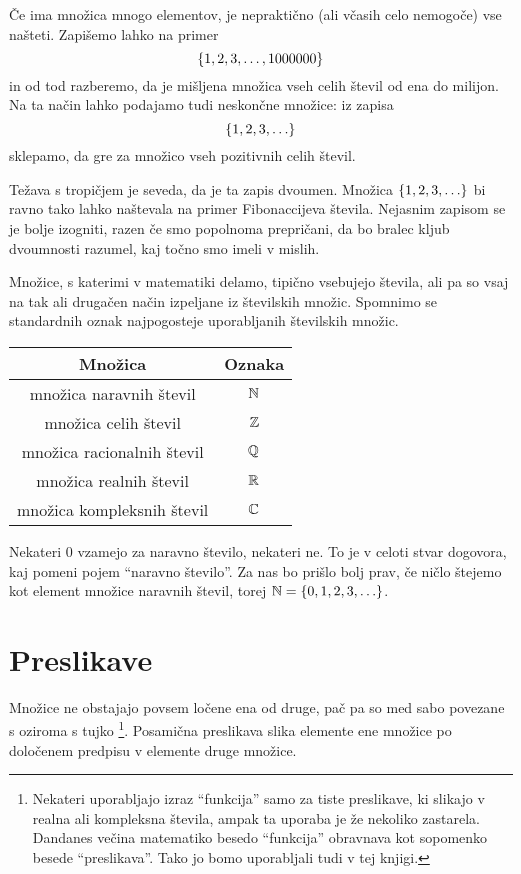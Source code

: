 Če ima množica mnogo elementov, je nepraktično (ali včasih celo nemogoče) vse našteti. Zapišemo lahko na primer
\[\set{1, 2, 3, \ldots, 1000000}\]
in od tod razberemo, da je mišljena množica vseh celih števil od ena do milijon. Na ta način lahko podajamo tudi neskončne množice: iz zapisa
\[\set{1, 2, 3, \ldots}\]
sklepamo, da gre za množico vseh pozitivnih celih števil.

Težava s tropičjem je seveda, da je ta zapis dvoumen. Množica $\set{1, 2, 3, \ldots}$ bi ravno tako lahko naštevala na primer Fibonaccijeva števila. Nejasnim zapisom se je bolje izogniti, razen če smo popolnoma prepričani, da bo bralec kljub dvoumnosti razumel, kaj točno smo imeli v mislih.

Množice, s katerimi v matematiki delamo, tipično vsebujejo števila, ali pa so vsaj na tak ali drugačen način izpeljane iz številskih množic. Spomnimo se standardnih oznak najpogosteje uporabljanih številskih množic.
\begin{center}
\begin{tabular}{|cc|}
\hline
\textbf{Množica} & \textbf{Oznaka} \\
\hline
množica naravnih števil & $\mathbb{N}$ \\
množica celih števil & $\mathbb{Z}$ \\
množica racionalnih števil & $\mathbb{Q}$ \\
množica realnih števil & $\mathbb{R}$ \\
množica kompleksnih števil & $\mathbb{C}$ \\
\hline
\end{tabular}
\end{center}

Nekateri $0$ vzamejo za naravno število, nekateri ne. To je v celoti stvar dogovora, kaj pomeni pojem ``naravno število''. Za nas bo prišlo bolj prav, če ničlo štejemo kot element množice naravnih števil, torej $\NN = \set{0, 1, 2, 3, \ldots}$.



\section{Preslikave}


Množice ne obstajajo povsem ločene ena od druge, pač pa so med sabo povezane s  oziroma s tujko \footnote{Nekateri uporabljajo izraz ``funkcija'' samo za tiste preslikave, ki slikajo v realna ali kompleksna števila, ampak ta uporaba je že nekoliko zastarela. Dandanes večina matematiko besedo ``funkcija'' obravnava kot sopomenko besede ``preslikava''. Tako jo bomo uporabljali tudi v tej knjigi.}. Posamična preslikava slika elemente ene množice po določenem predpisu v elemente druge množice.

